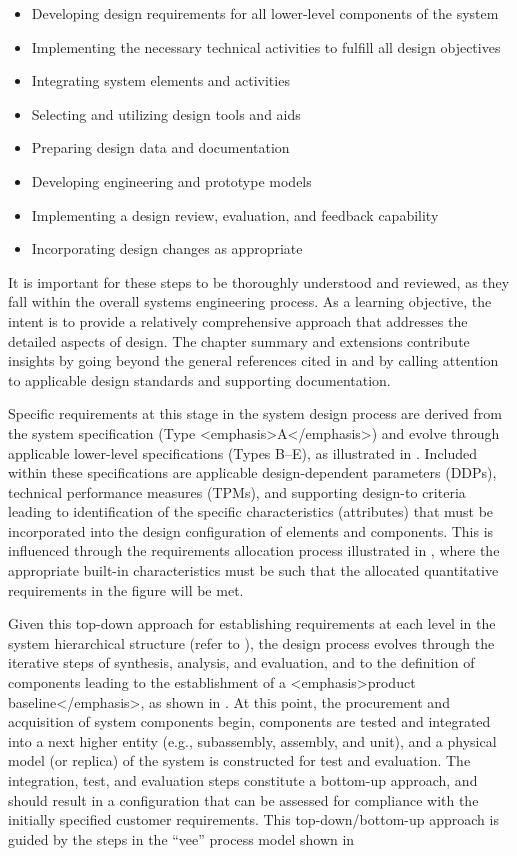 \begin{itemize}
\item Developing design requirements for all lower-level components of the system
\item Implementing the necessary technical activities to fulfill all design objectives
\item Integrating system elements and activities
\item Selecting and utilizing design tools and aids
\item Preparing design data and documentation
\item Developing engineering and prototype models
\item Implementing a design review, evaluation, and feedback capability
\item Incorporating design changes as appropriate
\end{itemize}

It is important for these steps to be thoroughly understood and reviewed, as they fall within the overall systems engineering process. As a learning objective, the intent is to provide a relatively comprehensive approach that addresses the detailed aspects of design. The chapter summary and extensions contribute insights by going beyond the general references cited in and by calling attention to applicable design standards and supporting documentation.

Specific requirements at this stage in the system design process are derived from the system specification (Type <emphasis>A</emphasis>) and evolve through applicable lower-level specifications (Types B–E), as illustrated in . Included within these specifications are applicable design-dependent parameters (DDPs), technical performance measures (TPMs), and supporting design-to criteria leading to identification of the specific characteristics (attributes) that must be incorporated into the design configuration of elements and components. This is influenced through the requirements allocation process illustrated in , where the appropriate built-in characteristics must be such that the allocated quantitative requirements in the figure will be met.

Given this top-down approach for establishing requirements at each level in the system hierarchical structure (refer to ), the design process evolves through the iterative steps of synthesis, analysis, and evaluation, and to the definition of components leading to the establishment of a <emphasis>product baseline</emphasis>, as shown in . At this point, the procurement and acquisition of system components begin, components are tested and integrated into a next higher entity (e.g., subassembly, assembly, and unit), and a physical model (or replica) of the system is constructed for test and evaluation. The integration, test, and evaluation steps constitute a bottom-up approach, and should result in a configuration that can be assessed for compliance with the initially specified customer requirements. This top-down/bottom-up approach is guided by the steps in the ``vee'' process model shown in 

